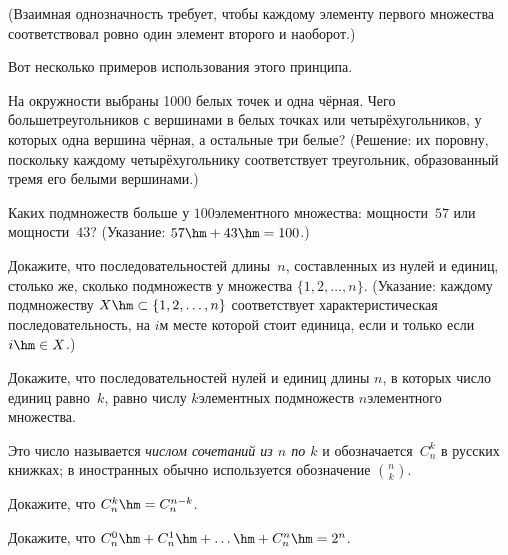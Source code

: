 \noindent
(Взаимная однозначность требует, чтобы каждому элементу
первого множества соответствовал ровно один элемент второго
и наоборот.)

Вот несколько примеров использования этого принципа.

\begin{problem}
На окружности выбраны 1000 белых точек и одна чёрная.
Чего больше\т треугольников с вершинами в белых точках
или четырёхугольников, у которых одна вершина чёрная,
а остальные три белые? (Решение: их поровну, поскольку
каждому четырёхугольнику соответствует треугольник,
образованный тремя его белыми вершинами.)
\end{problem}

\begin{problem}
Каких подмножеств больше у $100$\д элементного множества:
мощности~$57$ или мощности~$43$? (Указание: $57\hm+43\hm=100$.)
\end{problem}

\begin{problem}
Докажите, что последовательностей длины~$n$, составленных из
нулей и единиц, столько же, сколько подмножеств у множества
$\{1,2,\dots,n\}$. (Указание: каждому подмножеству
$X\hm\subset\{1,2,\dots,n\}$ соответствует  характеристическая
последовательность, на $i$\д м месте которой стоит единица,
если и только если
$i\hm\in X$.)
\end{problem}

\begin{problem}
Докажите, что последовательностей нулей и единиц длины $n$,
в которых число единиц равно~$k$, равно числу $k$\д элементных
подмножеств $n$\д элементного множества.
\end{problem}

\problskip

Это число называется \emph{числом сочетаний из $n$ по $k$}%
 и
обозначается~$C_n^k$ в русских книжках; в иностранных обычно
используется обозначение $\binom{n}{k}$.

\problskip

\begin{problem}
Докажите, что $C_n^k\hm=C_n^{n-k}$.
\end{problem}

\begin{problem}
Докажите, что $C_n^0\hm+C_n^1\hm+\ldots\hm+C_n^n\hm=2^n$.
\end{problem}

